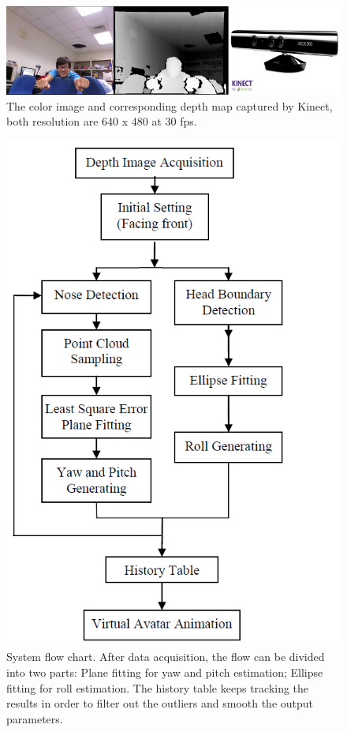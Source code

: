 \begin{figure}
\includegraphics[width=1.0\linewidth]{./fig2.png}
\caption{The color image and corresponding depth map captured by Kinect, both resolution are 640 x 480 at 30 fps.}
\label{fig:2}       %
\end{figure}

\begin{figure}
\includegraphics[width=1.0\linewidth]{./fig4.png}
\caption{System flow chart. After data acquisition, the flow can be divided into two parts: Plane fitting for yaw and pitch estimation; Ellipse fitting for roll estimation. The history table keeps tracking the results in order to filter out the outliers and smooth the output parameters.}
\label{fig:4}       %
\end{figure}

